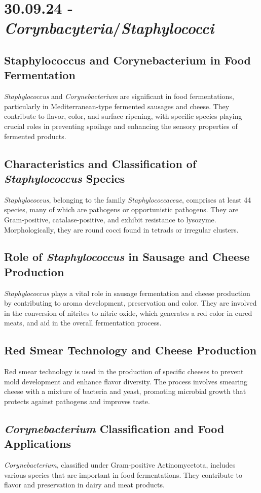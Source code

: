 \section{30.09.24 - \textit{Corynbacyteria}/\textit{Staphylococci}}
\subsection{Staphylococcus and Corynebacterium in Food Fermentation} 
\textit{Staphylococcus} and \textit{Corynebacterium} are significant in food fermentations, particularly in Mediterranean-type fermented sausages and cheese. They contribute to flavor, color, and surface ripening, with specific species playing crucial roles in preventing spoilage and enhancing the sensory properties of fermented products.

\subsection{Characteristics and Classification of \textit{Staphylococcus} Species} 
\textit{Staphylococcus}, belonging to the family \textit{Staphylococcaceae}, comprises at least 44 species, many of which are pathogens or opportunistic pathogens. They are Gram-positive, catalase-positive, and exhibit resistance to lysozyme. Morphologically, they are round cocci found in tetrads or irregular clusters.

\subsection{Role of \textit{Staphylococcus} in Sausage and Cheese Production} 
\textit{Staphylococcus} plays a vital role in sausage fermentation and cheese production by contributing to aroma development, preservation and color. They are involved in the conversion of nitrites to nitric oxide, which generates a red color in cured meats, and aid in the overall fermentation process.

\subsection{Red Smear Technology and Cheese Production} 
Red smear technology is used in the production of specific cheeses to prevent mold development and enhance flavor diversity. The process involves smearing cheese with a mixture of bacteria and yeast, promoting microbial growth that protects against pathogens and improves taste.

\subsection{\textit{Corynebacterium} Classification and Food Applications}
\textit{Corynebacterium}, classified under Gram-positive Actinomycetota, includes various species that are important in food fermentations. They contribute to flavor and preservation in dairy and meat products.

